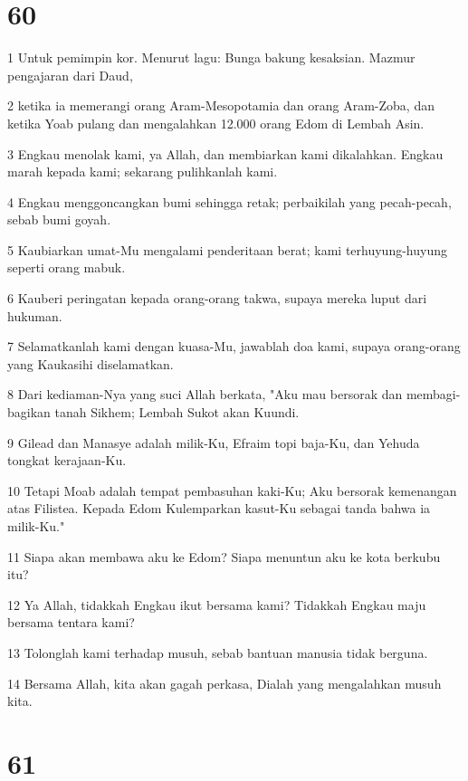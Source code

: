 \chapter{60}

\par 1 Untuk pemimpin kor. Menurut lagu: Bunga bakung kesaksian. Mazmur pengajaran dari Daud,
\par 2 ketika ia memerangi orang Aram-Mesopotamia dan orang Aram-Zoba, dan ketika Yoab pulang dan mengalahkan 12.000 orang Edom di Lembah Asin.
\par 3 Engkau menolak kami, ya Allah, dan membiarkan kami dikalahkan. Engkau marah kepada kami; sekarang pulihkanlah kami.
\par 4 Engkau menggoncangkan bumi sehingga retak; perbaikilah yang pecah-pecah, sebab bumi goyah.
\par 5 Kaubiarkan umat-Mu mengalami penderitaan berat; kami terhuyung-huyung seperti orang mabuk.
\par 6 Kauberi peringatan kepada orang-orang takwa, supaya mereka luput dari hukuman.
\par 7 Selamatkanlah kami dengan kuasa-Mu, jawablah doa kami, supaya orang-orang yang Kaukasihi diselamatkan.
\par 8 Dari kediaman-Nya yang suci Allah berkata, "Aku mau bersorak dan membagi-bagikan tanah Sikhem; Lembah Sukot akan Kuundi.
\par 9 Gilead dan Manasye adalah milik-Ku, Efraim topi baja-Ku, dan Yehuda tongkat kerajaan-Ku.
\par 10 Tetapi Moab adalah tempat pembasuhan kaki-Ku; Aku bersorak kemenangan atas Filistea. Kepada Edom Kulemparkan kasut-Ku sebagai tanda bahwa ia milik-Ku."
\par 11 Siapa akan membawa aku ke Edom? Siapa menuntun aku ke kota berkubu itu?
\par 12 Ya Allah, tidakkah Engkau ikut bersama kami? Tidakkah Engkau maju bersama tentara kami?
\par 13 Tolonglah kami terhadap musuh, sebab bantuan manusia tidak berguna.
\par 14 Bersama Allah, kita akan gagah perkasa, Dialah yang mengalahkan musuh kita.

\chapter{61}

